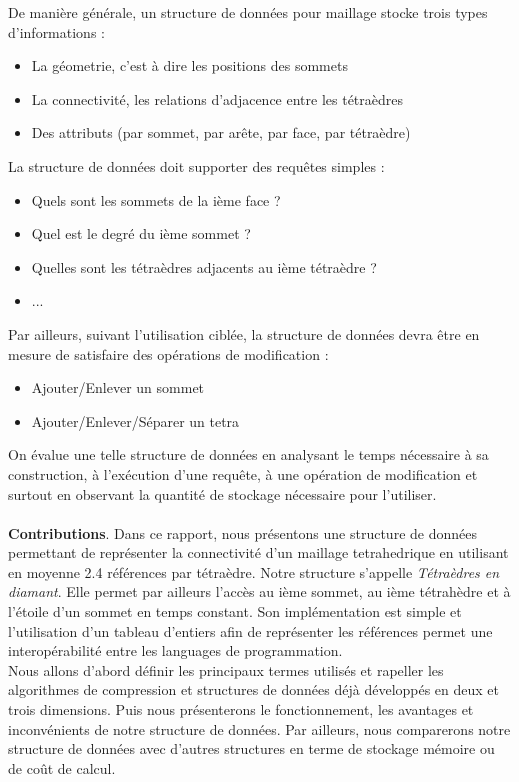 \documentclass[a4paper,11pt,openany]{article}
\begin{document}
De manière générale, un structure de données pour maillage stocke trois types d'informations :
\begin{itemize}
\item La géometrie, c'est à dire les positions des sommets
\item La connectivité, les relations d'adjacence entre les tétraèdres
\item Des attributs (par sommet, par arête, par face, par tétraèdre)
\end{itemize}
La structure de données doit supporter des requêtes simples :
\begin{itemize}
\item Quels sont les sommets de la ième face ?
\item Quel est le degré du ième sommet ?
\item Quelles sont les tétraèdres adjacents au ième tétraèdre ?
\item ...
\end{itemize}
Par ailleurs, suivant l'utilisation ciblée, la structure de données devra être en mesure de satisfaire des opérations de modification :
\begin{itemize}
\item Ajouter/Enlever un sommet
\item Ajouter/Enlever/Séparer un tetra\\
\end{itemize}
On évalue une telle structure de données en analysant le temps nécessaire à sa construction, à l'exécution d'une requête, à une opération de modification et surtout en observant la quantité de stockage nécessaire pour l'utiliser.\\\\
\textbf{Contributions}. Dans ce rapport, nous présentons une structure de données permettant de représenter la connectivité d'un maillage tetrahedrique en utilisant en moyenne 2.4 références par tétraèdre. Notre structure s'appelle \textit{Tétraèdres en diamant}. Elle permet par ailleurs l'accès au ième sommet, au ième tétrahèdre et à l'étoile d'un sommet en temps constant. Son implémentation est simple et l'utilisation d'un tableau d'entiers afin de représenter les références permet une interopérabilité entre les languages de programmation.\\
Nous allons d'abord définir les principaux termes utilisés et rapeller les algorithmes de compression et structures de données déjà développés en deux et trois dimensions. Puis nous présenterons le fonctionnement, les avantages et inconvénients de notre structure de données. Par ailleurs, nous comparerons notre structure de données avec d'autres structures en terme de stockage mémoire ou de coût de calcul.
\end{document}
